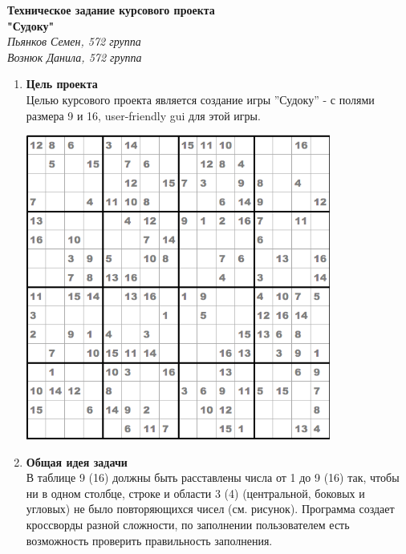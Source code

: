 \documentclass[12pt]{article}
\begin{document}
\begin{Large}
\begin{center}

\textbf{Техническое задание курсового проекта \\ "Судоку"\\}
\textit{Пьянков Семен, 572 группа\\
Вознюк Данила, 572 группа}

\end{center}
\end{Large}

\begin{enumerate}
\item \textbf{Цель проекта}\\
Целью курсового проекта является создание игры ''Судоку'' - с полями размера 9 и 16, user-friendly gui для этой игры.

    \includegraphics[width=10cm]{sixteen}
    
\item \textbf{Общая идея задачи}\\
В таблице 9 (16) должны быть расставлены числа от 1 до 9 (16) так, чтобы ни в одном столбце, строке и области 3 (4) (центральной, боковых и угловых) не было повторяющихся чисел (см. рисунок). Программа создает кроссворды разной сложности, по заполнении пользователем есть возможность проверить правильность заполнения.


\end{enumerate}
\end{document}
